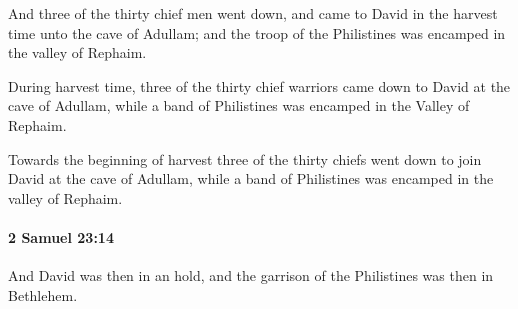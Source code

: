 			\begin{versebox}
					\item[BHS] 
					\item[ASV] And three of the thirty chief men went down, and came to David in the harvest time unto the cave of Adullam; and the troop of the Philistines was encamped in the valley of Rephaim.
					\item[NIV] During harvest time, three of the thirty chief warriors came down to David at the cave of Adullam, while a band of Philistines was encamped in the Valley of Rephaim.
					\item[NRSV] Towards the beginning of harvest three of the thirty chiefs went down to join David at the cave of Adullam, while a band of Philistines was encamped in the valley of Rephaim.
			\end{versebox}

		\paragraph{2 Samuel 23:14} %
			\label{2SAMUEL-23-14}

			And David was then in an hold, and the garrison of the Philistines was then in Bethlehem.

